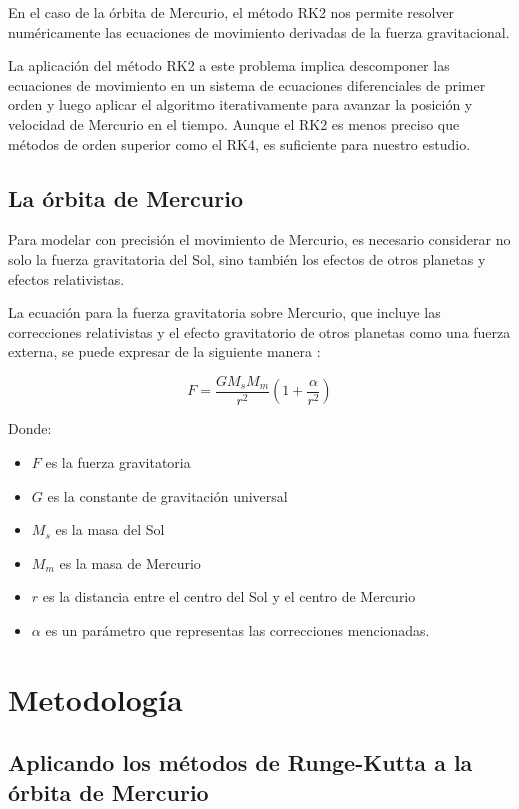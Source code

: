 \documentclass[twocolumn]{article}
\begin{document}
En el caso de la órbita de Mercurio, el método RK2 nos permite resolver numéricamente las ecuaciones de movimiento derivadas de la fuerza gravitacional.

La aplicación del método RK2 a este problema implica descomponer las ecuaciones de movimiento en un sistema de ecuaciones diferenciales de primer orden y luego aplicar el algoritmo iterativamente para avanzar la posición y velocidad de Mercurio en el tiempo. Aunque el RK2 es menos preciso que métodos de orden superior como el RK4, es suficiente para nuestro estudio.

\subsection*{La órbita de Mercurio}

Para modelar con precisión el movimiento de Mercurio, es necesario considerar no solo la fuerza gravitatoria del Sol, sino también los efectos de otros planetas y efectos relativistas.

La ecuación para la fuerza gravitatoria sobre Mercurio, que incluye las correcciones relativistas y el efecto gravitatorio de otros planetas como una fuerza externa, se puede expresar de la siguiente manera \cite{chang}:

\begin{equation}
F =  \frac{G M_s M_m }{r^2}(1 + \frac{\alpha}{r^2})
\end{equation}

Donde:
\begin{itemize}
\item $F$ es la fuerza gravitatoria
\item $G$ es la constante de gravitación universal
\item $M_s$ es la masa del Sol
\item $M_m$ es la masa de Mercurio
\item $r$ es la distancia entre el centro del Sol y el centro de Mercurio
\item $\alpha$ es un parámetro que representas las correcciones mencionadas.
\end{itemize}

\section{Metodología}
\subsection*{Aplicando los métodos de Runge-Kutta a la órbita de Mercurio}
\end{document}
